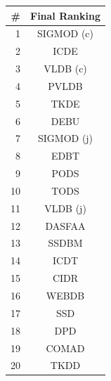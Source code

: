 \documentclass[msc]{ppgccufmg}
\begin{document}
\begin{table}[htbp]
\begin{tabular}{rc}
\toprule
\#		&	Final Ranking \\ 
\midrule
1		&		SIGMOD (c)	\\
2		&		ICDE		\\
3		&		VLDB (c)	\\
4		&		PVLDB		\\
5		&		TKDE		\\
6		&		DEBU		\\
7		&		SIGMOD (j)	\\
8		&		EDBT		\\
9		&		PODS		\\
10		&		TODS		\\
11		&		VLDB (j)	\\
12		&		DASFAA		\\
13		&		SSDBM		\\
14		&		ICDT		\\
15		&		CIDR		\\
16		&		WEBDB		\\
17		&		SSD			\\
18		&		DPD			\\
19		&		COMAD		\\
20		&		TKDD		\\
\bottomrule
\end{tabular}
\end{table}
\end{document}
